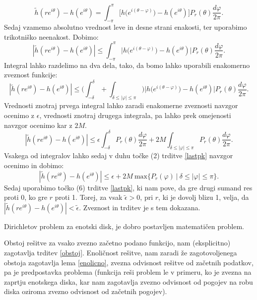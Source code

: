 \documentclass[mat1]{fmfdelo}
\begin{document}
\begin{dokaz}
        $$
            \widetilde{h}(re^{i\theta}) - h(e^{i\theta}) = \int_{-\pi}^{\pi}{\bigg[h\big(e^{i(\theta - \varphi)}\big) - h(e^{i\theta})\bigg]P_r(\theta)\frac{d\varphi}{2\pi}}.
        $$
        Sedaj vzamemo absolutno vrednost leve in desne strani enakosti, ter uporabimo trikotniško neenakost. Dobimo:
        $$
        |\widetilde{h}(re^{i\theta}) - h(e^{i\theta})| \leq \int_{-\pi}^{\pi}{\bigg| h\big(e^{i(\theta - \varphi)}\big) - h(e^{i\theta})\bigg|P_r(\theta)\frac{d\varphi}{2\pi}}.
        $$
        Integral lahko razdelimo na dva dela, tako, da bomo lahko uporabili enakomerno zveznost funkcije:
        $$
        |\widetilde{h}(re^{i\theta}) - h(e^{i\theta})| \leq \bigg(\int_{-\delta}^{\delta} + \int_{\delta \leq |\varphi| \le \pi}\bigg){\bigg| h\big(e^{i(\theta - \varphi)}\big) - h(e^{i\theta})\bigg|P_r(\theta)\frac{d\varphi}{2\pi}}.
        $$
        Vrednosti znotraj prvega integral lahko zaradi enakomerne zveznosti navzgor ocenimo z $\epsilon$, vrednosti znotraj drugega integrala, pa lahko prek omejenosti navzgor ocenimo kar z $2M$. 
        $$
        |\widetilde{h}(re^{i\theta}) - h(e^{i\theta})| \leq \epsilon \int_{-\delta}^{\delta}{P_r(\theta) \frac{d\varphi}{2\pi}} + 2M\int_{\delta \leq |\varphi| \leq \pi}{P_r(\theta)\frac{d\varphi}{2\pi}}.
        $$
        Vsakega od integralov lahko sedaj v duhu točke (2) trditve \ref{lastpk} navzgor ocenimo in dobimo:
        $$
        |\widetilde{h}(re^{i\theta}) - h(e^{i\theta})| \leq \epsilon  + 2M~\text{max}\{P_r(\varphi)~| ~\delta \leq |\varphi| \leq \pi \}.
        $$
        Sedaj uporabimo točko (6) trditve \ref{lastpk}, ki nam pove, da gre drugi sumand res proti 0, ko gre $r$ proti 1. 
        Torej, za vsak $\widetilde{\epsilon} > 0$, pri $r$, ki je dovolj blizu 1, velja, da $|\widetilde{h}(re^{i\theta}) - h(e^{i\theta})| < \widetilde{\epsilon}$.
        Zveznost in trditev je s tem dokazana.
        

     \end{dokaz}
     \begin{posledica}
        Dirichletov problem za enotski disk, je dobro postavljen matematičen problem. 
    \end{posledica}
    \begin{dokaz}
        Obstoj rešitve za vsako zvezno začetno podano funkcijo, nam (eksplicitno) zagotavlja trditev \ref{obstoj}. 
        Enoličnost rešitve, nam zaradi že zagotovoljenega obstoja zagotavlja lema \ref{enolicno}, zvezna odvisnost rešitve od začetnih podatkov, pa je predpostavka problema (funkcija reši problem le v primeru, ko je zvezna na zaprtju enotskega diska, kar nam zagotavlja zvezno odvisnost od pogojev na robu diska oziroma zvezno odvisnost od začetnih pogojev).
    \end{dokaz}
\end{document}
